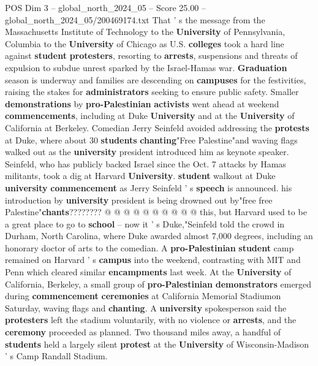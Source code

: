 \begin{textsample}{POS Dim 3 – global\_north\_2024\_05 – Score 25.00 – global\_north\_2024\_05/200469174.txt}  \label{ex:f3_pos_016}
That ' s the message from the Massachusetts Institute of Technology to the \textbf{University} of Pennsylvania, Columbia to the \textbf{University} of Chicago as U.S. \textbf{colleges} took a hard line against \textbf{student} \textbf{protesters}, resorting to \textbf{arrests}, suspensions and threats of expulsion to subdue unrest sparked by the Israel-Hamas war. \textbf{Graduation} season is underway and families are descending on \textbf{campuses} for the festivities, raising the stakes for \textbf{administrators} seeking to ensure public safety.
Smaller \textbf{demonstrations} by \textbf{pro-Palestinian} \textbf{activists} went ahead at weekend \textbf{commencements}, including at Duke \textbf{University} and at the \textbf{University} of California at Berkeley.
Comedian Jerry Seinfeld avoided addressing the \textbf{protests} at Duke, where about 30 \textbf{students} \textbf{chanting}"Free Palestine"and waving flags walked out as the \textbf{university} president introduced him as keynote speaker.
Seinfeld, who has publicly backed Israel since the Oct. 7 attacks by Hamas militants, took a dig at Harvard \textbf{University}. \textbf{student} walkout at Duke \textbf{university} \textbf{commencement} as Jerry Seinfeld ' s \textbf{speech} is announced. his introduction by \textbf{university} president is being drowned out by"free free Palestine"\textbf{chants}???????? @ @ @ @ @ @ @ @ @ @ this, but Harvard used to be a great place to go to \textbf{school} -- now it ' s Duke,"Seinfeld told the crowd in Durham, North Carolina, where Duke awarded almost 7,000 degrees, including an honorary doctor of arts to the comedian.
A \textbf{pro-Palestinian} \textbf{student} camp remained on Harvard ' s \textbf{campus} into the weekend, contrasting with MIT and Penn which cleared similar \textbf{encampments} last week.
At the \textbf{University} of California, Berkeley, a small group of \textbf{pro-Palestinian} \textbf{demonstrators} emerged during \textbf{commencement} \textbf{ceremonies} at California Memorial Stadiumon Saturday, waving flags and \textbf{chanting}.
A \textbf{university} spokesperson said the \textbf{protesters} left the stadium voluntarily, with no violence or \textbf{arrests}, and the \textbf{ceremony} proceeded as planned.
Two thousand miles away, a handful of \textbf{students} held a largely silent \textbf{protest} at the \textbf{University} of Wisconsin-Madison ' s Camp Randall Stadium.

\end{textsample}
